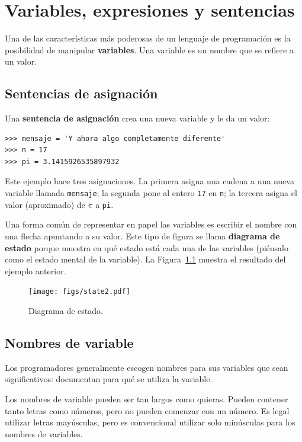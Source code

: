 \documentclass[10pt]{book}
\begin{document}
\chapter{Variables, expresiones y sentencias}

Una de las características más poderosas de un lenguaje de programación es la
posibilidad de manipular {\bf variables}.  Una variable es un nombre que
se refiere a un valor.


\section{Sentencias de asignación}
\label{variables}

Una {\bf sentencia de asignación} crea una nueva variable y le da
un valor:

\begin{verbatim}
>>> mensaje = 'Y ahora algo completamente diferente'
>>> n = 17
>>> pi = 3.1415926535897932
\end{verbatim}
%
Este ejemplo hace tres asignaciones.  La primera asigna una cadena
a una nueva variable llamada {\tt mensaje};
la segunda pone al entero {\tt 17} en {\tt n}; la tercera
asigna el valor (aproximado) de $\pi$ a {\tt pi}.

Una forma común de representar en papel las variables es escribir el nombre con
una flecha apuntando a su valor.  Este tipo de figura se
llama {\bf diagrama de estado} porque muestra en qué estado está cada una
de las variables (piénsalo como el estado mental de la variable).
La Figura~\ref{fig.state2} muestra el resultado del ejemplo anterior.

\begin{figure}
\centerline
{\texttt{[image: figs/state2.pdf]}}
\caption{Diagrama de estado.}
\label{fig.state2}
\end{figure}



\section{Nombres de variable}

Los programadores generalmente escogen nombres para sus variables que
sean significativos: documentan para qué se utiliza la variable.

Los nombres de variable pueden ser tan largos como quieras.  Pueden contener
tanto letras como números, pero no pueden comenzar con un número.
Es legal utilizar letras mayúsculas, pero es convencional
utilizar solo minúsculas para los nombres de variables.
\end{document}
